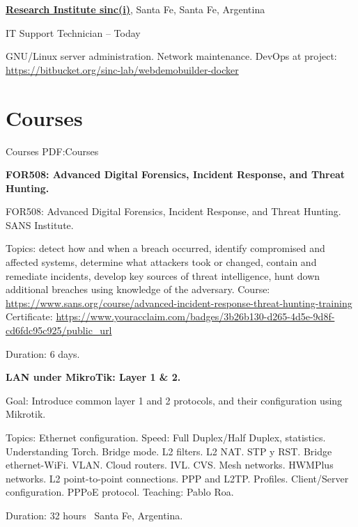 \documentclass[letterpaper,MMMyyyy,nonstop]{simpleresumecv}
\begin{document}
\begin{body}
\href{http://www.sinc.unl.edu.ar}
{\textbf{Research Institute sinc(i)}},
Santa Fe, Santa Fe, Argentina

\GapNoBreak
\BulletItem
IT Support Technician
\hfill
{} --
Today
\begin{detail}
\SubBulletItem
GNU/Linux server administration.
\SubBulletItem
Network maintenance.
\SubBulletItem
DevOps at project: \href{https://bitbucket.org/sinc-lab/webdemobuilder-docker}{https://bitbucket.org/sinc-lab/webdemobuilder-docker}
\end{detail}


\section
{Courses}
{Courses}
{PDF:Courses}


\textbf{FOR508: Advanced Digital Forensics, Incident Response, and Threat Hunting.}
\hfill
{}

\BulletItem FOR508: Advanced Digital Forensics, Incident Response, and Threat Hunting. SANS Institute.
\begin{detail}
	\SubBulletItem 
	Topics: detect how and when a breach occurred, identify compromised and affected systems, determine what attackers took or changed, contain and remediate incidents, develop key sources of threat intelligence, hunt down additional breaches using knowledge of the adversary.	
	\SubBulletItem
	Course: \href{https://www.sans.org/course/advanced-incident-response-threat-hunting-training}{https://www.sans.org/course/advanced-incident-response-threat-hunting-training}
	\SubBulletItem
	Certificate: \href{https://www.youracclaim.com/badges/3b26b130-d265-4d5e-9d8f-cd6fdc95c925/public\_url}{https://www.youracclaim.com/badges/3b26b130-d265-4d5e-9d8f-cd6fdc95c925/public\_url}
\end{detail}
Duration: 6 days.

\BigGap
\textbf{LAN under MikroTik: Layer 1 \& 2.}
\hfill
{}

\BulletItem Goal: Introduce common layer 1 and 2 protocols, and their configuration using Mikrotik.

\begin{detail}
	\SubBulletItem 
	Topics: Ethernet configuration. Speed: Full Duplex/Half Duplex, statistics. Understanding Torch. Bridge mode.  L2 filters. L2 NAT. STP y RST. Bridge ethernet-WiFi. VLAN. Cloud routers. IVL. CVS. Mesh networks. HWMPlus networks. L2 point-to-point connections. PPP and L2TP. Profiles. Client/Server configuration. PPPoE protocol.
	\SubBulletItem Teaching: Pablo Roa.
\end{detail}
Duration: 32 hours \SubBulletSymbol\, Santa Fe, Argentina.


\end{body}
\end{document}
